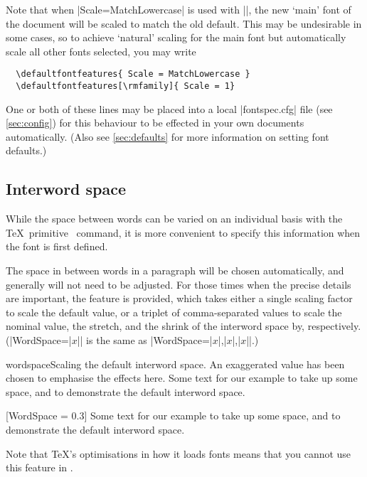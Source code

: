 Note that when |Scale=MatchLowercase| is used with |\setmainfont|, the new `main' font of the document will be scaled to match the old default.
This may be undesirable in some cases, so to achieve `natural' scaling for the main font but automatically scale all other fonts selected, you may write
\begin{Verbatim}
  \defaultfontfeatures{ Scale = MatchLowercase }
  \defaultfontfeatures[\rmfamily]{ Scale = 1}
\end{Verbatim}
One or both of these lines may be placed into a local |fontspec.cfg| file (see \vref{sec:config}) for this behaviour to be effected in your own documents automatically.
(Also see \vref{sec:defaults} for more information on setting font defaults.)



\subsection{Interword space}

While the space between words can be varied on an individual
basis with the \TeX\ primitive \cmd\spaceskip\ command, it is
more convenient to specify this information when the font is
first defined.

The space in between words in a paragraph will be chosen automatically,
and generally will not need to be adjusted. For those
times when the precise details are important, the 
feature is
provided, which takes either a single scaling factor to scale the
default value, or a triplet of comma-separated
values to scale the nominal value, the stretch, and the shrink of the
interword space by, respectively. (|WordSpace={|$x$|}| is the same as
|WordSpace={|$x$|,|$x$|,|$x$|}|.)

\begingroup
\let\centering\relax
\begin{Xexample}{wordspace}{Scaling the default interword space. An exaggerated value has been chosen to emphasise the effects here.}
  Some text for our example to take
  up some space, and to demonstrate
  the default interword space.
  \bigskip

    [WordSpace = 0.3]
  Some text for our example to take
  up some space, and to demonstrate
  the default interword space.
\end{Xexample}
\endgroup

Note that \TeX's optimisations in how it loads fonts means that you cannot
use this feature in .


